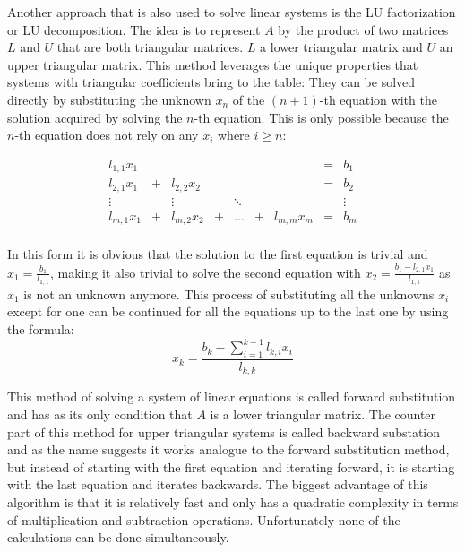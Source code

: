 Another approach that is also used to solve linear systems is the LU factorization or LU decomposition. The idea is to represent $A$ by the product of two matrices $L$ and $U$ that are both triangular matrices. $L$ a lower triangular matrix and $U$ an upper triangular matrix. This method leverages the unique properties that systems with triangular coefficients bring to the table: They can be solved directly by substituting the unknown $x_n$ of the $(n+1)$-th equation with the solution acquired by solving the $n$-th equation. This is only possible because the $n$-th equation does not rely on any $x_i$ where $i \geq n$:

\begin{equation}\label{eq:triangular_linsystem}
    \begin{array}{ccccccccc}
        l_{1,1} x_1 &&&&&& &=& b_1 \\
        l_{2,1} x_1 &+& l_{2,2} x_2 &&&& &=& b_2 \\
        \vdots && \vdots && \ddots && &&  \vdots\\
        l_{m,1} x_1 &+& l_{m,2} x_2 &+& \ldots&+& l_{m,m} x_m &=& b_m \\
    \end{array}
\end{equation}

In this form it is obvious that the solution to the first equation is trivial and $x_1 = \frac{b_1}{l_{1,1}}$, making it also trivial to solve the second equation with $x_2 = \frac{b_1 - l_{2,1} x_1}{l_{1,1}}$ as $x_1$ is not an unknown anymore. This process of substituting all the unknowns $x_i$ except for one can be continued for all the equations up to the last one by using the formula: 
\begin{equation}\label{eq:forwardsub_k}
   x_k = \frac{b_k - \sum_{i=1}^{k-1} l_{k,i} x_i}{l_{k,k}}
\end{equation}

This method of solving a system of linear equations is called forward substitution and has as its only condition that $A$ is a lower triangular matrix. The counter part of this method for upper triangular systems is called backward substation and as the name suggests it works analogue to the forward substitution method, but instead of starting with the first equation and iterating forward, it is starting with the last equation and iterates backwards. The biggest advantage of this algorithm is that it is relatively fast and only has a quadratic complexity in terms of multiplication and subtraction operations. Unfortunately none of the calculations can be done simultaneously. 

